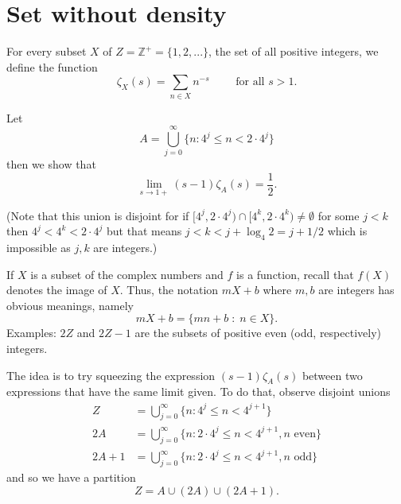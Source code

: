 \documentclass{article}
\newcommand{\Z}{\mathbb{Z}}
\begin{document}
\section{Set without density}

For every subset $X$ of $Z = \Z^+ = \{1, 2, ...\}$, the set of all positive integers, we define the function
$$\zeta_X(s) = \sum_{n \in X} n^{-s} \qquad \text{ for all } s > 1.$$

Let
$$A = \bigcup_{j = 0}^{\infty} \{n : 4^j \leq n < 2 \cdot 4^j\}$$
then we show that
$$\lim_{s \rightarrow 1+} (s - 1) \zeta_A(s) = \frac{1}{2}.$$

(Note that this union is disjoint for if $[4^j, 2\cdot 4^j) \cap [4^k, 2 \cdot 4^k) \not= \emptyset$ for some $j < k$ then $4^j < 4^k < 2 \cdot 4^j$ but that means $j < k < j + \log_4 2 = j + 1/2$ which is impossible as $j, k$ are integers.)

If $X$ is a subset of the complex numbers and $f$ is a function, recall that $f(X)$ denotes the image of $X$.
Thus, the notation $mX + b$ where $m, b$ are integers has obvious meanings, namely
$$m X + b = \{mn + b \;:\; n \in X\}.$$
Examples: $2Z$ and $2Z - 1$ are the subsets of positive even (odd, respectively) integers.

The idea is to try squeezing the expression $(s - 1) \zeta_A(s)$ between two expressions that have the same limit given.
To do that, observe disjoint unions
\begin{align*}
Z &= \bigcup_{j = 0}^{\infty} \{n : 4^j \leq n < 4^{j+1}\}\\
2A &= \bigcup_{j = 0}^{\infty} \{n : 2 \cdot 4^j \leq n < 4^{j+1}, n \text{ even}\}\\
2A + 1 &= \bigcup_{j = 0}^{\infty} \{n : 2 \cdot 4^j \leq n < 4^{j+1}, n \text{ odd}\}
\end{align*}
and so we have a partition
$$Z = A \cup (2A) \cup (2A + 1).$$
\end{document}
